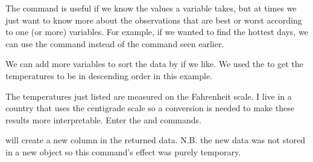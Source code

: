 The  command is useful if we know the values a variable takes, but at times we just want to know more about the observations that are best or worst according to one (or more) variables. For example, if we wanted to find the hottest days, we can use the  command instead of the  command seen earlier. 
\begin{knitrout}
\color{fgcolor}
\end{knitrout}
We can add more variables to sort the data by if we like. We used the  to get the temperatures to be in descending order in this example. 
 
The temperatures just listed are measured on the Fahrenheit scale. I live in a country that uses the centigrade scale so a conversion is needed to make these results more interpretable. Enter the  and  
 commands.  
 
\begin{knitrout}
\color{fgcolor}
\end{knitrout}
will create a new column in the returned data. N.B. the new data was not stored in a new object so this command's effect was purely temporary. 
 
